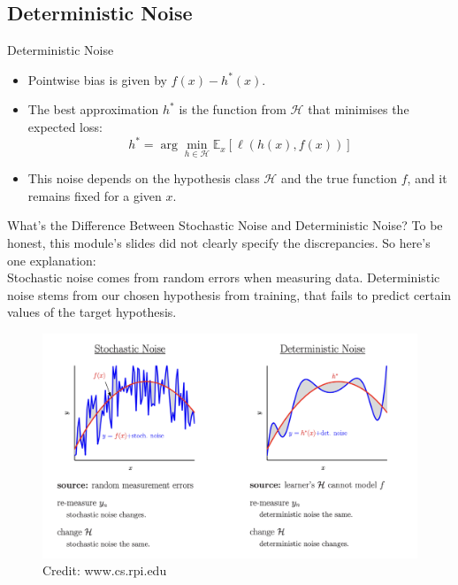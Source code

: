 \subsection*{Deterministic Noise}
\begin{definitionbox}{Deterministic Noise}
\begin{itemize}
    \item Pointwise bias is given by \( f(x) - h^*(x) \).
    \item The best approximation \( h^* \) is the function from \( \mathcal{H} \) that minimises the expected loss:
    \[ h^* = \arg\min_{h \in \mathcal{H}} \mathbb{E}_x [\ell(h(x), f(x))] \]
    \item This noise depends on the hypothesis class \( \mathcal{H} \) and the true function \( f \), and it remains fixed for a given \( x \).
\end{itemize}
\end{definitionbox}

\begin{commentbox}{What's the Difference Between Stochastic Noise and Deterministic Noise?}
To be honest, this module's slides did not clearly specify the discrepancies. So here's one explanation:\\

Stochastic noise comes from random errors when measuring data. Deterministic noise stems from our chosen hypothesis from training, that fails to predict certain values of the target hypothesis.\\


\begin{figure}[H]
    \centering
    \includegraphics[width=0.85\linewidth]{img/svsdnoise.png}
    \caption{Credit: www.cs.rpi.edu}
    \label{fig:svsdnoise-label}
\end{figure}
\end{commentbox}

